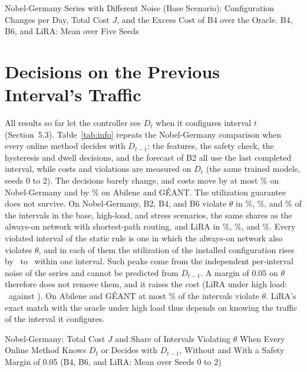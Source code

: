\documentclass[preprint,12pt]{elsarticle}
\begin{document}
\begin{table}[h!]
\centering
\caption{Nobel-Germany Series with Different Noise (Base Scenario): Configuration Changes per Day, Total Cost $J$, and the Excess Cost of B4 over the Oracle. B4, B6, and LiRA: Mean over Five Seeds}
\label{tab:noise}
\footnotesize
\setlength{\tabcolsep}{3pt}
\begin{adjustbox}{max width=\linewidth}\end{adjustbox}
\end{table}


\section{Decisions on the Previous Interval's Traffic}\label{sec:res-stale}

All results so far let the controller see $D_t$ when it configures interval $t$ (Section~5.3). Table~\ref{tab:info} repeats the Nobel-Germany comparison when every online method decides with $D_{t-1}$: the features, the safety check, the hysteresis and dwell decisions, and the forecast of B2 all use the last completed interval, while costs and violations are measured on $D_t$ (the same trained models, seeds 0 to 2). The decisions barely change, and costs move by at most \staleNobMaxDJ\% on Nobel-Germany and by \staleRealDJtext\% on Abilene and G\'{E}ANT. The utilization guarantee does not survive. On Nobel-Germany, B2, B4, and B6 violate $\theta$ in \staleBzerobase\%, \staleBzerohl\%, and \staleBzerost\% of the intervals in the base, high-load, and stress scenarios, the same shares as the always-on network with shortest-path routing, and LiRA in \staleLiRAViolbase\%, \staleLiRAViolhl\%, and \staleLiRAViolst\%. Every violated interval of the static rule is one in which the always-on network also violates $\theta$, and in each of them the utilization of the installed configuration rises by \staleJumpMin\ to \staleJumpMax\ within one interval. Such peaks come from the independent per-interval noise of the series and cannot be predicted from $D_{t-1}$. A margin of $0.05$ on $\theta$ therefore does not remove them, and it raises the cost (LiRA under high load: \marginLiRAhlJ\ against \nobJLiRAhl). On Abilene and G\'{E}ANT at most \staleRealMaxViol\% of the intervals violate $\theta$. LiRA's exact match with the oracle under high load thus depends on knowing the traffic of the interval it configures.




\begin{table}[h!]
\centering
\caption{Nobel-Germany: Total Cost $J$ and Share of Intervals Violating $\theta$ When Every Online Method Knows $D_t$ or Decides with $D_{t-1}$, Without and With a Safety Margin of 0.05 (B4, B6, and LiRA: Mean over Seeds 0 to 2)}
\label{tab:info}
\scriptsize
\setlength{\tabcolsep}{3pt}
\begin{adjustbox}{max width=\linewidth}\end{adjustbox}
\end{table}
\end{document}
